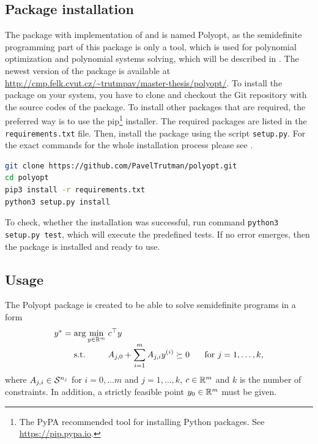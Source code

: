 \subsection{Package installation}
The package with implementation of  and  is named Polyopt, as the semidefinite programming part of this package is only a tool, which is  used for polynomial optimization and polynomial systems solving, which will be described in .
The newest version of the package is available at \url{http://cmp.felk.cvut.cz/~trutmpav/master-thesis/polyopt/}.
To install the package on your system, you have to clone and checkout the Git repository with the source codes of the package.
To install other packages that are required, the preferred way is to use the pip\footnote{The PyPA recommended tool for installing Python packages. See \url{https://pip.pypa.io}.} installer. The required packages are listed in the \texttt{requirements.txt} file.
Then, install the package using the script \texttt{setup.py}.
For the exact commands for the whole installation process please see .
\begin{lstlisting}[language=bash, caption={Installation of the package Polyopt.}, labellis={SDP:imp:install}]
git clone https://github.com/PavelTrutman/polyopt.git
cd polyopt
pip3 install -r requirements.txt
python3 setup.py install
\end{lstlisting}
To check, whether the installation was successful, run command \texttt{python3 setup.py test}, which will execute the predefined tests.
If no error emerges, then the package is installed and ready to use.

\subsection{Usage}
The Polyopt package is created to be able to solve semidefinite programs in a form
\begin{align}
  \arraycolsep=1.4pt
  \begin{array}{rclrcl@{\hskip0.5cm}l}
    y^* &=& \displaystyle \arg\min_{y\in\R^m} & \multicolumn{3}{l}{c^\top y} \\
    && \text{s.t.} & \displaystyle A_{j,0} + \sum_{i=1}^m A_{j,i}y\ind i &\succeq& 0 & \text{ for } j = 1,\ldots,k,
  \end{array}
\end{align}
where $A_{j,i}\in\mathcal{S}^{n_j}$ for $i = 0,\dots m$ and $j=1,\dots,k$, $c\in\mathbb{R}^m$ and $k$ is the number of constraints.
In addition, a strictly feasible point $y_0\in\mathbb{R}^m$ must be given.

